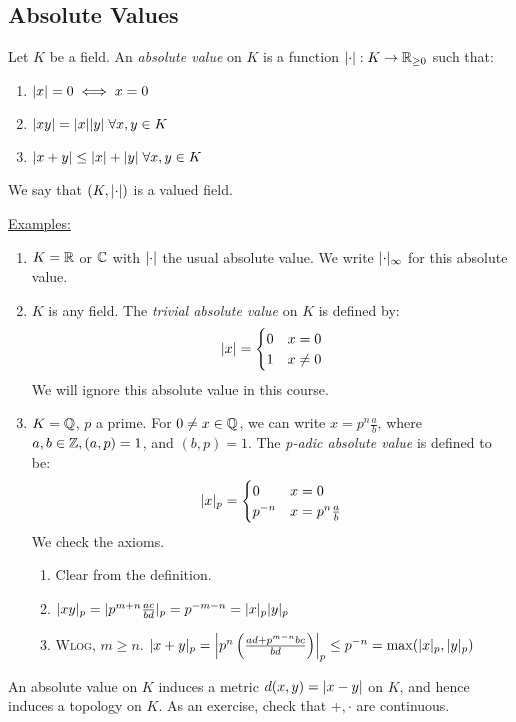 \documentclass[10pt,a4paper]{article}
\begin{document}
\subsection{Absolute Values}
\begin{definition}
Let $K$ be a field. An \emph{absolute value} on $K$ is a function $\lvert\cdot\rvert:K \to \mathbb{R}_{\geq 0}$ such that:
\begin{enumerate}
  \item $\lvert x\rvert = 0 \iff x = 0$
  \item $\abs{xy} = \abs{x}\abs{y}\forall x, y \in K$
  \item $\abs{x+y} \leq \abs{x}+\abs{y}\forall x, y \in K$
\end{enumerate}
We say that $(K, \lvert\cdot\rvert)$ is a valued field.
\end{definition}
\underline{Examples: }
\begin{enumerate}
  \item $K = \mathbb{R}$ or $\mathbb{C}$ with $\lvert\cdot\rvert$ the usual absolute value. We write $\lvert\cdot\rvert_\infty$ for this absolute value.
  \item $K$ is any field. The \emph{trivial absolute value} on $K$ is defined by:
  \begin{align}
    \lvert x\rvert = \begin{cases} 0 & x = 0 \\ 1 & x \neq 0 \end{cases}
  \end{align}
  We will ignore this absolute value in this course.
  \item $K = \mathbb{Q}$, $p$ a prime. For $0 \neq x \in \mathbb{Q}$, we can write $x = p^n \frac{a}{b}$, where $a, b \in \mathbb{Z}, (a, p) = 1$, and $(b, p) = 1$. The \emph{p-adic absolute value} is defined to be:
  \begin{align*}
    \lvert x\rvert_p = \begin{cases} 0 & x = 0 \\ p^{-n} & x = p^n\frac{a}{b} \end{cases}
  \end{align*}
  We check the axioms.
  \begin{enumerate}[label=\textit{\arabic*.}]
    \item Clear from the definition.
    \item $\lvert xy\rvert_p = \lvert p^{m+n}\frac{ac}{bd}\rvert_p = p^{-m-n} = \lvert x\rvert_p\lvert y\rvert_p$
    \item \textsc{Wlog}, $m\geq n$. $\lvert x+y\rvert_p = \left|p^n\left(\frac{ad+p^{m-n}bc}{bd}\right)\right|_p \leq p^{-n} = \max(\lvert x\rvert_p, \lvert y\rvert_p)$
  \end{enumerate}
\end{enumerate}
An absolute value on $K$ induces a metric $d(x,y) = \lvert x-y\rvert$ on $K$, and hence induces a topology on $K$. As an exercise, check that $+, \cdot$ are continuous.
\end{document}
